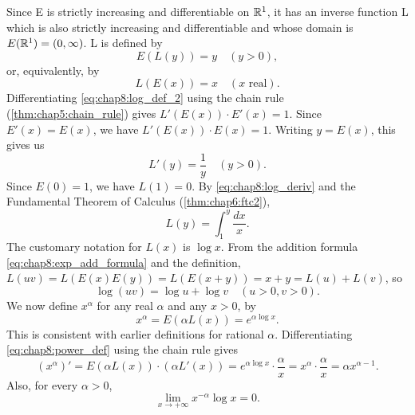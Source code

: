 Since E is strictly increasing and differentiable on $\mathbb{R}^1$, it has
an inverse function L which is also strictly increasing and
differentiable and whose domain is $E(\mathbb{R}^1) = (0, \infty)$. L is defined by
\begin{equation} \label{eq:chap8:log_def_1}
  E(L(y)) = y \quad (y > 0),
\end{equation}
or, equivalently, by
\begin{equation} \label{eq:chap8:log_def_2}
  L(E(x)) = x \quad (x \text{ real}).
\end{equation}
Differentiating \eqref{eq:chap8:log_def_2} using the chain rule
(\autoref{thm:chap5:chain_rule}) gives $L'(E(x)) \cdot E'(x) = 1$.
Since $E'(x) = E(x)$, we have $L'(E(x)) \cdot E(x) = 1$. Writing $y =
E(x)$, this gives us
\begin{equation} \label{eq:chap8:log_deriv}
  L'(y) = \frac{1}{y} \quad (y > 0).
\end{equation}
Since $E(0)=1$, we have $L(1)=0$. By \eqref{eq:chap8:log_deriv} and
the Fundamental Theorem of Calculus (\autoref{thm:chap6:ftc2}),
\begin{equation} \label{eq:chap8:log_integral_def}
  L(y) = \int_1^y \frac{dx}{x}.
\end{equation}
The customary notation for $L(x)$ is $\log x$.
From the addition formula \eqref{eq:chap8:exp_add_formula} and the
definition, $L(uv) = L(E(x)E(y)) = L(E(x+y)) = x+y = L(u)+L(v)$, so
\begin{equation} \label{eq:chap8:log_product_rule}
  \log(uv) = \log u + \log v \quad (u>0, v>0).
\end{equation}
We now define $x^\alpha$ for any real $\alpha$ and any $x>0$, by
\begin{equation} \label{eq:chap8:power_def}
  x^\alpha = E(\alpha L(x)) = e^{\alpha \log x}.
\end{equation}
This is consistent with earlier definitions for rational $\alpha$.
Differentiating \eqref{eq:chap8:power_def} using the chain rule gives
\begin{equation} \label{eq:chap8:power_deriv}
  (x^\alpha)' = E(\alpha L(x)) \cdot (\alpha L'(x)) = e^{\alpha \log
  x} \cdot \frac{\alpha}{x} = x^\alpha \cdot \frac{\alpha}{x} =
  \alpha x^{\alpha-1}.
\end{equation}
Also, for every $\alpha > 0$,
\begin{equation} \label{eq:chap8:log_power_limit}
  \lim_{x \to +\infty} x^{-\alpha} \log x = 0.
\end{equation}

